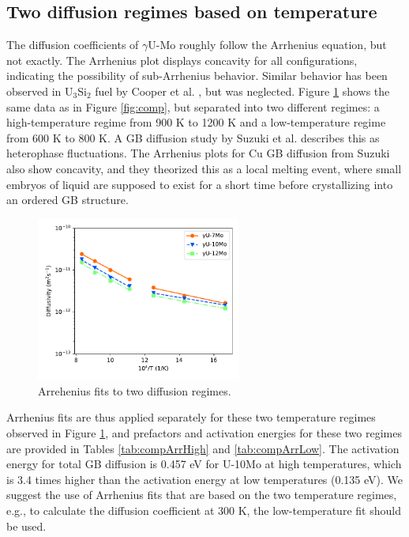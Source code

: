 \documentclass{elsarticle}
\begin{document}
\FloatBarrier
\subsection{Two diffusion regimes based on temperature}

The diffusion coefficients of $\gamma$U-Mo roughly follow the Arrhenius equation, but not exactly. The Arrhenius plot displays concavity for all configurations, indicating the possibility of sub-Arrhenius behavior. Similar behavior has been observed in U$_3$Si$_2$ fuel by Cooper et al. \cite{cooper2021}, but was neglected. Figure \ref{fig:2reg} shows the same data as in Figure \ref{fig:comp}, but separated into two different regimes: a high-temperature regime from 900 K to 1200 K and a low-temperature regime from 600 K to 800 K. A GB diffusion study by Suzuki et al. \cite{suzuki2005} describes this as heterophase fluctuations. The Arrhenius plots for Cu GB diffusion from Suzuki also show concavity, and they theorized this as a local melting event, where small embryos of liquid are supposed to exist for a short time before crystallizing into an ordered GB structure.

\begin{figure}[!ht]
\centering
\includegraphics[width=0.60\textwidth]{2reg.pdf}
\caption{Arrehenius fits to two diffusion regimes.}
\label{fig:2reg}
\end{figure}

Arrhenius fits are thus applied separately for these two temperature regimes observed in Figure \ref{fig:2reg}, and prefactors and activation energies for these two regimes are provided in Tables \ref{tab:compArrHigh} and \ref{tab:compArrLow}. The activation energy for total GB diffusion is 0.457 eV for U-10Mo at high temperatures, which is 3.4 times higher than the activation energy at low temperatures (0.135 eV). We suggest the use of Arrhenius fits that are based on the two temperature regimes, e.g., to calculate the diffusion coefficient at 300 K, the low-temperature fit should be used. 
\end{document}
